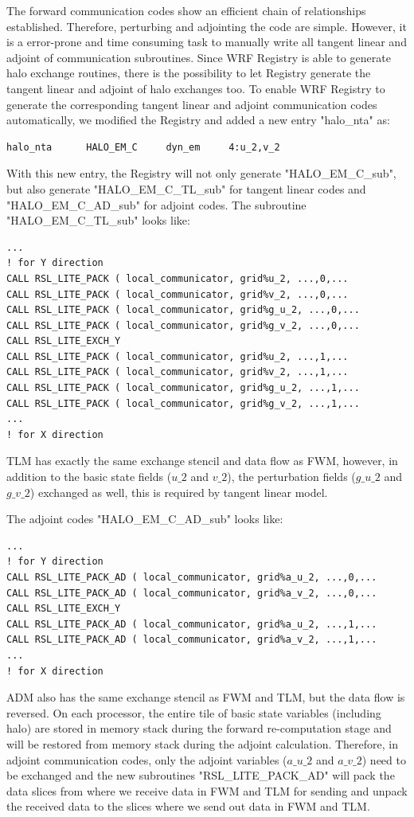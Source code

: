 \documentclass[12pt]{article}
\begin{document}
The forward communication codes show an efficient chain of relationships established. Therefore, perturbing and adjointing the code are simple. However, it is a error-prone and time consuming task to manually write all tangent linear and adjoint of communication subroutines. Since WRF Registry is able to generate halo exchange routines, there is the possibility to let Registry generate the tangent linear and adjoint of halo exchanges too. To enable WRF Registry to generate the corresponding tangent linear and adjoint communication codes automatically, we modified the Registry and added a new entry "halo\_nta" as:
\begin{Verbatim}[frame=single]
halo_nta      HALO_EM_C     dyn_em     4:u_2,v_2
\end{Verbatim}
With this new entry, the Registry will not only generate "HALO\_EM\_C\_sub", but also generate "HALO\_EM\_C\_TL\_sub" for tangent linear codes and "HALO\_EM\_C\_AD\_sub" for adjoint codes. The subroutine "HALO\_EM\_C\_TL\_sub" looks like:
\begin{Verbatim}[frame=single]
...
! for Y direction
CALL RSL_LITE_PACK ( local_communicator, grid%u_2, ...,0,...
CALL RSL_LITE_PACK ( local_communicator, grid%v_2, ...,0,...
CALL RSL_LITE_PACK ( local_communicator, grid%g_u_2, ...,0,...
CALL RSL_LITE_PACK ( local_communicator, grid%g_v_2, ...,0,...
CALL RSL_LITE_EXCH_Y
CALL RSL_LITE_PACK ( local_communicator, grid%u_2, ...,1,...
CALL RSL_LITE_PACK ( local_communicator, grid%v_2, ...,1,...
CALL RSL_LITE_PACK ( local_communicator, grid%g_u_2, ...,1,...
CALL RSL_LITE_PACK ( local_communicator, grid%g_v_2, ...,1,...
...
! for X direction
\end{Verbatim}
TLM has exactly the same exchange stencil and data flow as FWM, however, in addition to the basic state fields ($u\_2$ and $v\_2$), the perturbation fields ($g\_u\_2$ and $g\_v\_2$) exchanged as well, this is required by tangent linear model.
 
The adjoint codes "HALO\_EM\_C\_AD\_sub" looks like:
\begin{Verbatim}[frame=single]
...
! for Y direction
CALL RSL_LITE_PACK_AD ( local_communicator, grid%a_u_2, ...,0,...
CALL RSL_LITE_PACK_AD ( local_communicator, grid%a_v_2, ...,0,...
CALL RSL_LITE_EXCH_Y
CALL RSL_LITE_PACK_AD ( local_communicator, grid%a_u_2, ...,1,...
CALL RSL_LITE_PACK_AD ( local_communicator, grid%a_v_2, ...,1,...
...
! for X direction
\end{Verbatim}
ADM also has the same exchange stencil as FWM and TLM, but the data flow is reversed. On each processor, the entire tile of basic state variables (including halo) are stored in memory stack during the forward re-computation stage and will be restored from memory stack during the adjoint calculation. Therefore, in adjoint communication codes, only the adjoint variables ($a\_u\_2$ and $a\_v\_2$) need to be exchanged and the new subroutines "RSL\_LITE\_PACK\_AD" will pack the data slices from where we receive data in FWM and TLM for sending and unpack the received data to the slices where we send out data in FWM and TLM. 
\end{document}
